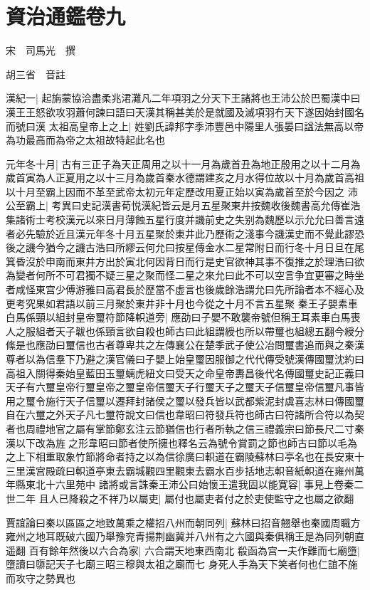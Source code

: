 \section{資治通鑑卷九}
宋　司馬光　撰

胡三省　音註

漢紀一|{
	起旃蒙協洽盡柔兆涒灘凡二年項羽之分天下王諸將也王沛公於巴蜀漢中曰漢王王怒欲攻羽蕭何諫曰語曰天漢其稱甚美於是就國及滅項羽冇天下遂因始封國名而號曰漢}
太祖高皇帝上之上|{
	姓劉氏諱邦字季沛豐邑中陽里人張晏曰諡法無高以帝為功最高而為帝之太祖故特起此名也}


元年冬十月|{
	古有三正子為天正周用之以十一月為歲首丑為地正殷用之以十二月為歲首寅為人正夏用之以十三月為歲首秦水德謂建亥之月水得位故以十月為歲首高祖以十月至霸上因而不革至武帝太初元年定歷改用夏正始以寅為歲首至於今因之}
沛公至霸上|{
	考異曰史記漢書荀悦漢紀皆云是月五星聚東井按魏收後魏書高允傳崔浩集諸術士考校漢元以來日月薄蝕五星行度并譏前史之失别為魏歷以示允允曰善言遠者必先驗於近且漢元年冬十月五星聚於東井此乃歷術之淺事今譏漢史而不覺此謬恐後之譏今猶今之譏古浩曰所繆云何允曰按星傳金水二星常附日而行冬十月日旦在尾箕昏沒於申南而東井方出於寅北何因背日而行是史官欲神其事不復推之於理浩曰欲為變者何所不可君獨不疑三星之聚而怪二星之來允曰此不可以空言争宜更審之時坐者咸怪東宫少傅游雅曰高君長於歷當不虚言也後歲餘浩謂允曰先所論者本不經心及更考究果如君語以前三月聚於東井非十月也今從之十月不言五星聚}
秦王子嬰素車白馬係頸以組封皇帝璽符節降軹道旁|{
	應劭曰子嬰不敢襲帝號但稱王耳素車白馬喪人之服組者天子韍也係頸言欲自殺也師古曰此組謂綬也所以帶璽也組總五翻今綬分絛是也應劭曰璽信也古者尊卑共之左傳襄公在楚季武子使公冶問璽書追而與之秦漢尊者以為信羣下乃避之漢官儀曰子嬰上始皇璽因服御之代代傳受號漢傳國璽沈約曰高祖入關得秦始皇藍田玉璽螭虎紐文曰受天之命皇帝夀昌後代名傳國璽史記正義曰天子有六璽皇帝行璽皇帝之璽皇帝信璽天子行璽天子之璽天子信璽皇帝信璽凡事皆用之璽令施行天子信璽以遷拜封諸侯之璽以發兵皆以武都紫泥封虞喜志林曰傳國璽自在六璽之外天子凡七璽符說文曰信也韋昭曰符發兵符也師古曰符諸所合符以為契者也周禮地官之屬有掌節鄭玄注云節猶信也行者所執之信三禮義宗曰節長尺二寸秦漢以下改為旌之形韋昭曰節者使所擁也釋名云為號令賞罰之節也師古曰節以毛為之上下相重取象竹節將命者持之以為信徐廣曰軹道在霸陵蘇林曰亭名也在長安東十三里漢宫殿疏曰軹道亭東去霸城觀四里觀東去霸水百步括地志軹音紙軹道在雍州萬年縣東北十六里苑中}
諸將或言誅秦王沛公曰始懷王遣我固以能寛容|{
	事見上卷秦二世二年}
且人已降殺之不祥乃以屬吏|{
	屬付也屬吏者付之於吏使監守之也屬之欲翻}


賈誼論曰秦以區區之地致萬乘之權招八州而朝同列|{
	蘇林曰招音翹舉也秦國周職方雍州之地耳既破六國乃舉豫兖青揚荆幽冀并八州有之六國與秦俱稱王是為同列朝直遥翻}
百有餘年然後以六合為家|{
	六合謂天地東西南北}
殽函為宫一夫作難而七廟墮|{
	墮讀曰隳記天子七廟三昭三穆與太祖之廟而七}
身死人手為天下笑者何也仁誼不施而攻守之勢異也

